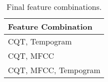 \begin{table}[t]
    \centering
    \begin{tabular}{|l|}
    \hline
    \textbf{Feature Combination} \\ \hline\hline
    CQT, Tempogram               \\ \hline
    CQT, MFCC                    \\ \hline
    CQT, MFCC, Tempogram         \\ \hline
    \end{tabular}
    \caption{Final feature combinations.}
    \label{tab:final_feature_combo}
\end{table}